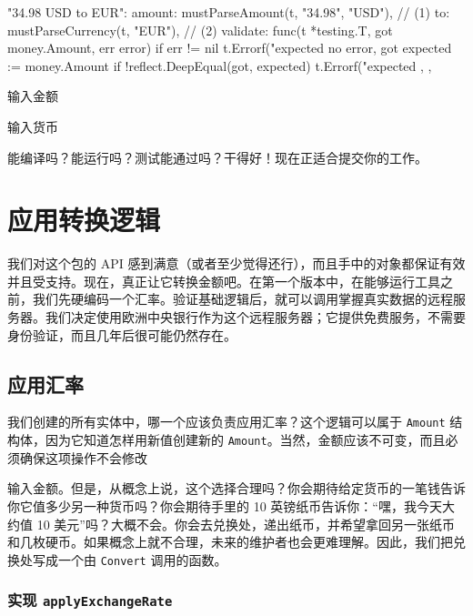 \begin{gocode}[title={代码清单 6.17 \texttt{convert\_test.go}：在测试用例中调用 \texttt{mustParse}}]
"34.98 USD to EUR": {
    amount:   mustParseAmount(t, "34.98", "USD"), // (1)
    to:       mustParseCurrency(t, "EUR"), // (2)
    validate: func(t *testing.T, got money.Amount, err error) {
        if err != nil {
            t.Errorf("expected no error, got %
        }
        expected := money.Amount{}
        if !reflect.DeepEqual(got, expected) {
            t.Errorf("expected %
        }
    },
},
\end{gocode}

\begin{codeannotations}
\item 输入金额
\item 输入货币
\end{codeannotations}

能编译吗？能运行吗？测试能通过吗？干得好！现在正适合提交你的工作。

\section{应用转换逻辑}

我们对这个包的 API 感到满意（或者至少觉得还行），而且手中的对象都保证有效并且受支持。现在，真正让它转换金额吧。在第一个版本中，在能够运行工具之前，我们先硬编码一个汇率。验证基础逻辑后，就可以调用掌握真实数据的远程服务器。我们决定使用欧洲中央银行作为这个远程服务器；它提供免费服务，不需要身份验证，而且几年后很可能仍然存在。

\subsection{应用汇率}

我们创建的所有实体中，哪一个应该负责应用汇率？这个逻辑可以属于 \texttt{Amount} 结构体，因为它知道怎样用新值创建新的 \texttt{Amount}。当然，金额应该不可变，而且必须确保这项操作不会修改

输入金额。但是，从概念上说，这个选择合理吗？你会期待给定货币的一笔钱告诉你它值多少另一种货币吗？你会期待手里的 10 英镑纸币告诉你：“嘿，我今天大约值 10 美元”吗？大概不会。你会去兑换处，递出纸币，并希望拿回另一张纸币和几枚硬币。如果概念上就不合理，未来的维护者也会更难理解。因此，我们把兑换处写成一个由 \texttt{Convert} 调用的函数。

\subsubsection*{实现 \texttt{applyExchangeRate}}

